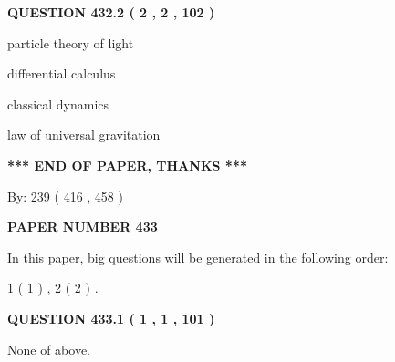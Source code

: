 \documentclass[12pt]{article}
\begin{document}
 
  
\vspace{0.2in}
  
{\textbf{\Large{QUESTION
432.2 
 ( 2 , 2 , 102 )
}}}
  
  
 
 
\noindent{}
 
 
particle theory of light
 
 
differential calculus
 
 
classical dynamics
 
 
law of universal gravitation
 
 
 
 
   
   
\vspace{1.0in} 
{\textbf{\large{ *** END OF PAPER, THANKS *** }}} 
   
   
\hspace{1.0in} By: 
 239 ( 416 ,  458 )
   
   
   
   
\newpage 
\setcounter{page}{ 
   433001 } 
   
   
   
   
 {\textbf{ \Large{ PAPER NUMBER  433  }}}
   
   
\vspace{0.2in}
   
   
   
   
   
\vspace{0.2in}
   
In this paper, big questions will be generated in the following order: 
   
   
   1 ( 1 )
 ,
   2 ( 2 )
 .
  
\vspace{0.2in}
  
{\textbf{\Large{QUESTION
433.1 
 ( 1 , 1 , 101 )
}}}
  
  
 
 
\noindent{}
 
 
 None of above.
 
\end{document}
